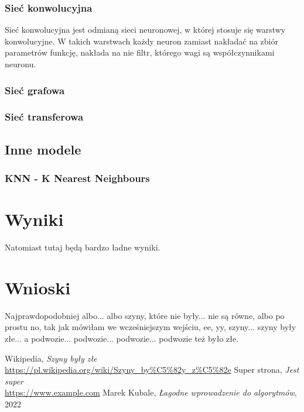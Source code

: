 \documentclass{article}
\begin{document}
\subsubsection{Sieć konwolucyjna}
Sieć konwolucyjna jest odmianą sieci neuronowej, w której stosuje się warstwy konwolucyjne. W takich warstwach każdy neuron zamiast nakładać na zbiór parametrów funkcję, nakłada na nie filtr, którego wagi są współczynnikami neuronu. 
\subsubsection{Sieć grafowa}
\subsubsection{Sieć transferowa}

\subsection{Inne modele}
\subsubsection{KNN - K Nearest Neighbours}

\section{Wyniki}

Natomiast tutaj będą bardzo ładne wyniki.

\section{Wnioski}

Najprawdopodobniej albo... albo szyny, 
które nie były... nie są równe, 
albo po prostu no, tak jak mówiłam we 
wcześniejszym wejściu, ee, yy, szyny... 
szyny były złe... a podwozie... podwozie... 
podwozie... podwozie też było złe. \cite{szyny}

\renewcommand{\refname}{Źródła}
\begin{thebibliography}{100}
     Wikipedia, 
    \textit{Szyny były złe} 
    \\\url{https://pl.wikipedia.org/wiki/Szyny_by%C5%82y_z%C5%82e}
     Super strona,
    \textit{Jest super}
    \\\url{https://www.example.com}
     Marek Kubale,
    \textit{Łagodne wprowadzenie do algorytmów}, 2022
\end{thebibliography}
\end{document}
